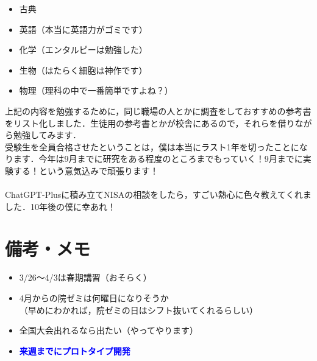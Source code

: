 \documentclass[a4paper,12pt]{ltjsarticle}
\newcommand{\important}[1]{\textcolor{blue}{\textbf{#1}}}
\begin{document}
\begin{itemize}
  \item 古典
  \item 英語（本当に英語力がゴミです）
  \item 化学（エンタルピーは勉強した）
  \item 生物（はたらく細胞は神作です）
  \item 物理（理科の中で一番簡単ですよね？）
\end{itemize}

上記の内容を勉強するために，同じ職場の人とかに調査をしておすすめの参考書をリスト化しました．生徒用の参考書とかが校舎にあるので，それらを借りながら勉強してみます．\\

受験生を全員合格させたということは，僕は本当にラスト1年を切ったことになります．今年は9月までに研究をある程度のところまでもっていく！9月までに実験する！という意気込みで頑張ります！\\\\

ChatGPT-Plusに積み立てNISAの相談をしたら，すごい熱心に色々教えてくれました．10年後の僕に幸あれ！
\newpage

\section*{備考・メモ}
\begin{itemize}
  \item 3/26～4/3は春期講習（おそらく）\\
  \item 4月からの院ゼミは何曜日になりそうか\\（早めにわかれば，院ゼミの日はシフト抜いてくれるらしい）\\
  \item 全国大会出れるなら出たい（やってやります）\\
  \item \important{来週までにプロトタイプ開発}
\end{itemize}
\end{document}
